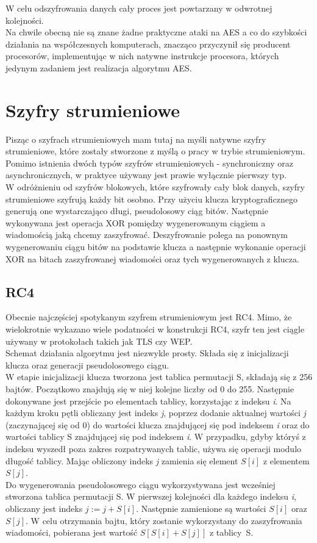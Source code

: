 W celu odszyfrowania danych cały proces jest powtarzany w odwrotnej kolejności. \\
Na chwile obecną nie są znane żadne praktyczne ataki na AES a co do szybkości działania na współczesnych komputerach,
znacząco przyczynił się producent procesorów, implementując w nich natywne instrukcje procesora, których 
jedynym zadaniem jest realizacja algorytmu AES.

\section{Szyfry strumieniowe}
Pisząc o szyfrach strumieniowych mam tutaj na myśli natywne szyfry strumieniowe, które zostały stworzone z myślą o pracy w trybie strumieniowym. 
Pomimo istnienia dwóch typów szyfrów strumieniowych - synchroniczny oraz asynchronicznych, w praktyce używany jest prawie wyłącznie pierwszy typ. \\
W odróżnieniu od szyfrów blokowych, które szyfrowały cały blok danych, szyfry strumieniowe szyfrują każdy bit osobno. 
Przy użyciu klucza kryptograficznego generują one wystarczająco długi, pseudolosowy ciąg bitów. 
Następnie wykonywana jest operacja XOR pomiędzy wygenerowanym ciągiem a wiadomością jaką chcemy zaszyfrować. 
Deszyfrowanie polega na ponownym wygenerowaniu ciągu bitów na podstawie klucza a następnie wykonanie operacji XOR na bitach zaszyfrowanej wiadomości oraz tych wygenerowanych z klucza.

\subsection{RC4}
Obecnie najczęściej spotykanym szyfrem strumieniowym jest RC4. Mimo, że wielokrotnie wykazano wiele podatności w konstrukcji RC4, szyfr ten jest ciągle używany w protokołach takich jak TLS czy WEP. \\
Schemat działania algorytmu jest niezwykle prosty. 
Składa się z inicjalizacji klucza oraz generacji pseudolosowego ciągu. \\
W etapie inicjalizacji klucza tworzona jest tablica permutacji S, składają się z 256 bajtów. 
Początkowo znajdują się w niej kolejne liczby od 0 do 255. 
Następnie dokonywane jest przejście po elementach tablicy, korzystając z indeksu \textit{i}. Na każdym kroku pętli obliczany jest indeks \textit{j}, poprzez dodanie aktualnej wartości \textit{j} (zaczynającej się od 0) do wartości klucza znajdującej się pod indeksem \textit{i} oraz do wartości tablicy S znajdującej się pod indeksem \textit{i}. W przypadku, gdyby któryś z indeksu wyszedł poza zakres rozpatrywanych tablic, używa się operacji modulo długość tablicy. Mając obliczony indeks \textit{j} zamienia się element $S[i]$ z elementem $S[j]$. \\
Do wygenerowania pseudolosowego ciągu wykorzystywana jest wcześniej stworzona tablica permutacji S. W pierwszej kolejności dla każdego indeksu \textit{i}, obliczany jest indeks $j := j + S[i]$. 
Następnie zamienione są wartości $S[i]$ oraz $S[j]$. W celu otrzymania bajtu, który zostanie wykorzystany do zaszyfrowania wiadomości, pobierana jest wartość $S[S[i] + S[j]]$ z tablicy~S.

